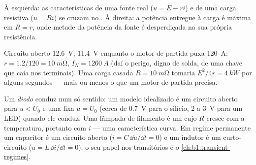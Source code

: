 \begin{omfigure}
\qquad
{}

{\small À esquerda: as características de uma fonte real ($u = E - ri$) e
de uma carga resistiva ($u = Ri$) se cruzam no . À direita: a
potência entregue à carga é máxima em $R = r$, onde metade da potência da
fonte é desperdiçada na sua própria resistência.}
\end{omfigure}

\begin{example}\label{ex:b1:dc-circuits:battery}
Circuito aberto \qty{12.6}{V}; \qty{11.4}{V} enquanto o motor de partida puxa
\qty{120}{A}: $r = 1.2/120 = \qty{10}{m\ohm}$, $I_N = \qty{1260}{A}$
(daí o perigo, digno de solda, de uma chave que caia nos terminais). Uma carga casada
$R = \qty{10}{m\ohm}$ tomaria $E^2/4r = \qty{4}{kW}$ por alguns
segundos --- mais ou menos o que um motor de partida precisa.
\end{example}

\begin{remark}\label{rem:b1:dc-circuits:others}
Um \emph{diodo} conduz num só sentido: um modelo idealizado é um
circuito aberto para $u < U_0$ e uma  fixa $u = U_0$ (cerca de
\qty{0.7}{V} para o silício, \qty{2}{} a \qty{3}{V} para um LED) quando ele
conduz. Uma lâmpada de filamento é um  cujo $R$ cresce com a
temperatura, portanto com $i$ --- uma característica curva. Em regime
permanente um capacitor é um circuito aberto ($i = C\,\dd u/\dd t = 0$) e um
indutor é um curto-circuito ($u = L\,\dd i/\dd t = 0$); o seu papel nos
transitórios é o \cref{ch:b1:transient-regimes}.
\end{remark}


